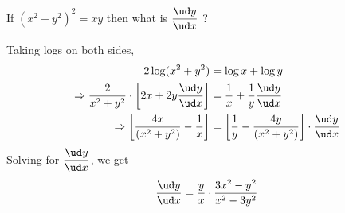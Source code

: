 	\question[7] If $(x^2+y^2)^2=xy$ then what is $\dfrac{\ud y}{\ud x}$ ?
    \ifprintanswers
    \fi 
    \begin{solution}[\fullpage]
    Taking logs on both sides,
      \begin{align}
        2\log(x^2+y^2) &= \log x + \log y \\ 
        \Rightarrow \dfrac{2}{x^2+y^2}\cdot\left[ 2x+2y\dfrac{\ud y}{\ud x}\right] &=
        \dfrac{1}{x} + \dfrac{1}{y}\dfrac{\ud y}{\ud x} \\ 
        \Rightarrow\left[\frac{4x}{(x^2+y^2)}-\frac{1}{x}\right] &=
        \left[\frac{1}{y} - \frac{4y}{(x^2+y^2)}\right]\cdot\frac{\ud y}{\ud x} 
      \end{align}  
      Solving for $\dfrac{\ud y}{\ud x}$, we get \\
      \begin{align}
         \dfrac{\ud y}{\ud x} = \frac{y}{x} \cdot \dfrac{3x^2-y^2}{x^2-3y^2}  
      \end{align} 
      
    \end{solution} 
